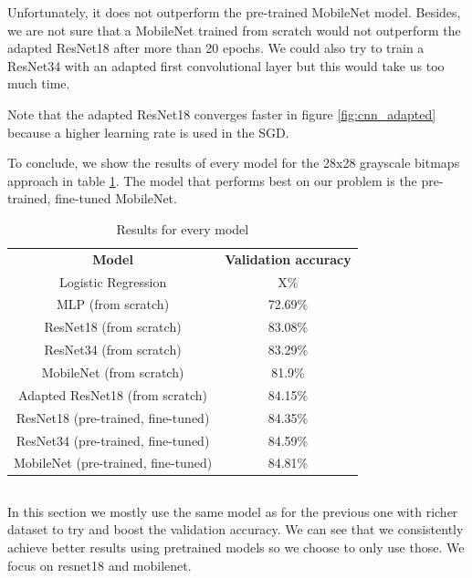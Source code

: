 \documentclass[10pt,twocolumn,letterpaper]{article}
\begin{document}
Unfortunately, it does not outperform the pre-trained MobileNet model. Besides, we are not sure that a MobileNet trained from scratch would not outperform the adapted ResNet18 after more than 20 epochs. We could also try to train a ResNet34 with an adapted first convolutional layer but this would take us too much time.

Note that the adapted ResNet18 converges faster in figure \ref{fig:cnn_adapted} because a higher learning rate is used in the SGD.

To conclude, we show the results of every model for the 28x28 grayscale bitmaps approach in table \ref{tab:cnn_every_results}. The model that performs best on our problem is the pre-trained, fine-tuned MobileNet.

\begin{table}[h]
    \centering
    \begin{tabular}{c|c}
    \textbf{Model}                      & \textbf{Validation accuracy} \\
    Logistic Regression                 & X\%                 \\
    MLP (from scratch)                  & 72.69\%             \\
    ResNet18 (from scratch)             & 83.08\%             \\
    ResNet34 (from scratch)             & 83.29\%             \\
    MobileNet (from scratch)            & 81.9\%              \\
    Adapted ResNet18 (from scratch)     & 84.15\%             \\
    ResNet18 (pre-trained, fine-tuned)  & 84.35\%             \\
    ResNet34 (pre-trained, fine-tuned)  & 84.59\%             \\
    MobileNet (pre-trained, fine-tuned) & 84.81\%            
    \end{tabular}
    \caption{Results for every model}
    \label{tab:cnn_every_results}
\end{table}

\subsection{\imgenTitle{}}
In this section we mostly use the same model as for the previous one with richer dataset to try and boost the validation accuracy.
We can see that we consistently achieve better results using pretrained models so we choose to only use those. We focus on resnet18 and mobilenet.
\end{document}
